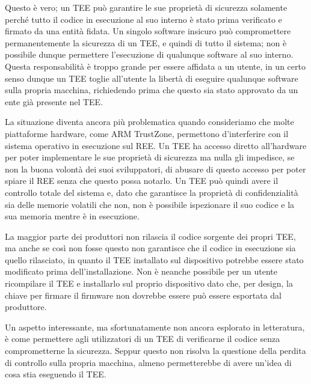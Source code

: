 \documentclass[12pt,italian]{report}
\begin{document}
Questo è vero; un TEE può garantire le sue proprietà di sicurezza solamente
perché tutto il codice in esecuzione al suo interno è stato prima verificato
e firmato da una entità fidata.
Un singolo software insicuro può compromettere permanentemente la sicurezza
di un TEE, e quindi di tutto il sistema; non è possibile dunque permettere
l'esecuzione di qualunque software al suo interno.
Questa responsabilità è troppo grande per essere affidata a un utente,
in un certo senso dunque un TEE toglie all'utente la libertà di eseguire
qualunque software sulla propria macchina, richiedendo prima che questo
sia stato approvato da un ente già presente nel TEE.

La situazione diventa ancora più problematica quando consideriamo che
molte piattaforme hardware, come ARM TrustZone, permettono d'interferire
con il sistema operativo in esecuzione sul REE. %
Un TEE ha accesso diretto all'hardware per poter implementare le sue proprietà
di sicurezza ma nulla gli impedisce, se non la buona volontà dei suoi
sviluppatori, di abusare di questo accesso per poter spiare il REE senza che
questo possa notarlo.
Un TEE può quindi avere il controllo totale del sistema e, dato che garantisce
la proprietà di confidenzialità sia delle memorie volatili che non, non è
possibile ispezionare il suo codice e la sua memoria mentre è in esecuzione.

La maggior parte dei produttori non rilascia il codice sorgente dei propri TEE,
ma anche se così non fosse questo non garantisce che il codice in esecuzione
sia quello rilasciato, in quanto il TEE installato sul dispositivo potrebbe
essere stato modificato prima dell'installazione.
Non è neanche possibile per un utente ricompilare il TEE e installarlo
sul proprio dispositivo dato che, per design, la chiave per firmare il firmware
non dovrebbe essere può essere esportata dal produttore.

Un aspetto interessante, ma sfortunatamente non ancora esplorato in letteratura,
è come permettere agli utilizzatori di un TEE di verificarne il codice senza
comprometterne la sicurezza.
Seppur questo non risolva la questione della perdita di controllo sulla
propria macchina, almeno permetterebbe di avere un'idea di cosa stia eseguendo
il TEE.
\end{document}
